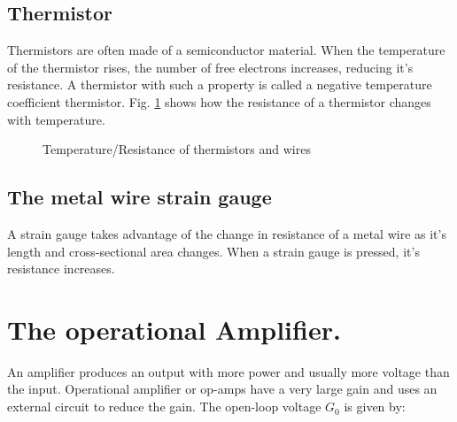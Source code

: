 \documentclass{scrbook}
\begin{document}
\subsection{Thermistor}

	Thermistors are often made of a semiconductor material. When the temperature of the thermistor rises, the number of free electrons increases, reducing it's resistance. A thermistor with such a property is called a negative temperature coefficient thermistor. Fig. \ref{therm} shows how the resistance of a thermistor changes with temperature.

	\begin{figure}[h]
	\caption{Temperature/Resistance of thermistors and wires}
	\label{therm}
	\centering
	\end{figure}

\subsection{The metal wire strain gauge}

	A strain gauge takes advantage of the change in resistance of a metal wire as it's length and cross-sectional area changes. When a strain gauge is pressed, it's resistance increases.

\section{The operational Amplifier.}

	An amplifier produces an output with more power and usually more voltage than the input. Operational amplifier or op-amps have a very large gain and uses an external circuit to reduce the gain. The open-loop voltage $G_0$ is given by:
\end{document}
